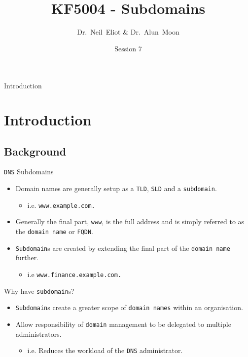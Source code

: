 \documentclass[xcolor=table]{beamer}
\title{KF5004 - Subdomains}
\author{Dr.~Neil~Eliot \& Dr.~Alun~Moon}
\institute[Northumbria University] %
{
  Department of Computer and Information Sciences\\
  University of Northumbria
}
\date{Session 7}
\begin{document}
\begin{frame}
  \titlepage
\end{frame}

\begin{frame}{Introduction}
  \tableofcontents
\end{frame}


\section{Introduction}
\subsection{Background}
\begin{frame}{\texttt{DNS} Subdomains}
  \begin{itemize}
    \item Domain names are generally setup as a \texttt{TLD}, \texttt{SLD} and a \texttt{subdomain}.
      \begin{itemize}
        \item i.e. \texttt{www.example.com.}
      \end{itemize}
    \item Generally the final part, \texttt{www}, is the full address and is simply referred to as the \texttt{domain name} or \texttt{FQDN}.
    \item \texttt{Subdomain}s are created by extending the final part of the \texttt{domain name} further.
      \begin{itemize}
        \item i.e \texttt{www.finance.example.com.}
      \end{itemize}
  \end{itemize}
\end{frame}

\begin{frame}{Why have \texttt{subdomain}s?}
  \begin{itemize}
    \item \texttt{Subdomain}s create a greater scope of \texttt{domain names} within an organisation.
    \item Allow responsibility of \texttt{domain} management to be delegated to multiple administrators.
    \begin{itemize}
      \item i.e. Reduces the workload of the \texttt{DNS} administrator.
    \end{itemize}
  \end{itemize}
\end{frame}
\end{document}
